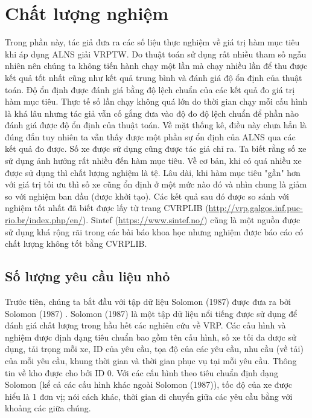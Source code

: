 \section{Chất lượng nghiệm}

Trong phần này, tác giả đưa ra các số liệu thực nghiệm về giá trị hàm mục tiêu khi áp dụng ALNS giải VRPTW. Do thuật toán sử dụng rất nhiều tham số ngẫu nhiên nên chúng ta không tiến hành chạy một lần mà chạy nhiều lần để thu được kết quả tốt nhất cũng như kết quả trung bình và đánh giá độ ổn định của thuật toán. Độ ổn định được đánh giá bằng độ lệch chuẩn của các kết quả đo giá trị hàm mục tiêu. Thực tế số lần chạy không quá lớn do thời gian chạy mỗi cấu hình là khá lâu nhưng tác giả vẫn cố gắng đưa vào độ đo độ lệch chuẩn để phần nào đánh giá được độ ổn định của thuật toán. Về mặt thống kê, điều này chưa hẳn là đúng đắn tuy nhiên ta vẫn thấy được một phần sự ổn định của ALNS qua các kết quả đo được. Số xe được sử dụng cũng được tác giả chỉ ra. Ta biết rằng số xe sử dụng ảnh hưởng rất nhiều đến hàm mục tiêu. Về cơ bản, khi có quá nhiều xe được sử dụng thì chất lượng nghiệm là tệ. Lâu dài, khi hàm mục tiêu "gần" hơn với giá trị tối ưu thì số xe cũng ổn định ở một mức nào đó và nhìn chung là giảm so với nghiệm ban đầu (được khởi tạo). Các kết quả sau đó được so sánh với nghiệm tốt nhất đã biết được lấy từ trang CVRPLIB (\href{http://vrp.galgos.inf.puc-rio.br/index.php/en/}{http://vrp.galgos.inf.puc-rio.br/index.php/en/}). Sintef (\href{https://www.sintef.no/}{https://www.sintef.no/}) cũng là một nguồn được sử dụng khá rộng rãi trong các bài báo khoa học nhưng nghiệm được báo cáo có chất lượng không tốt bằng CVRPLIB. 

\subsection{Số lượng yêu cầu liệu nhỏ}
\label{sec:exp_small}

Trước tiên, chúng ta bắt đầu với tập dữ liệu Solomon (1987) được đưa ra bởi Solomon (1987) \cite{solomon1987algorithms}. Solomon (1987) là một tập dữ liệu nổi tiếng được sử dụng để đánh giá chất lượng trong hầu hết các nghiên cứu về VRP. Các cấu hình và nghiệm được định dạng tiêu chuẩn bao gồm tên cấu hình, số xe tối đa dược sử dụng, tải trọng mỗi xe, ID của yêu cầu, tọa độ của các yêu cầu, nhu cầu (về tải) của mỗi yêu cầu, khung thời gian và thời gian phục vụ tại mỗi yêu cầu. Thông tin về kho được cho bởi ID 0. Với các cấu hình theo tiêu chuẩn định dạng Solomon (kể cả các cấu hình khác ngoài Solomon (1987)), tốc độ của xe được hiểu là 1 đơn vị; nói cách khác, thời gian di chuyển giữa các yêu cầu bằng với khoảng các giữa chúng. 

